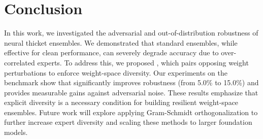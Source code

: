 \section{Conclusion}

In this work, we investigated the adversarial and out-of-distribution robustness of neural thicket ensembles. We demonstrated that standard \randopt ensembles, while effective for clean performance, can severely degrade \ood accuracy due to over-correlated experts. To address this, we proposed \methodname, which pairs opposing weight perturbations to enforce weight-space diversity. Our experiments on the \rgsm benchmark show that \methodname significantly improves \ood robustness (from 5.0\% to 15.0\%) and provides measurable gains against adversarial noise. These results emphasize that explicit diversity is a necessary condition for building resilient weight-space ensembles. Future work will explore applying Gram-Schmidt orthogonalization to further increase expert diversity and scaling these methods to larger foundation models.
